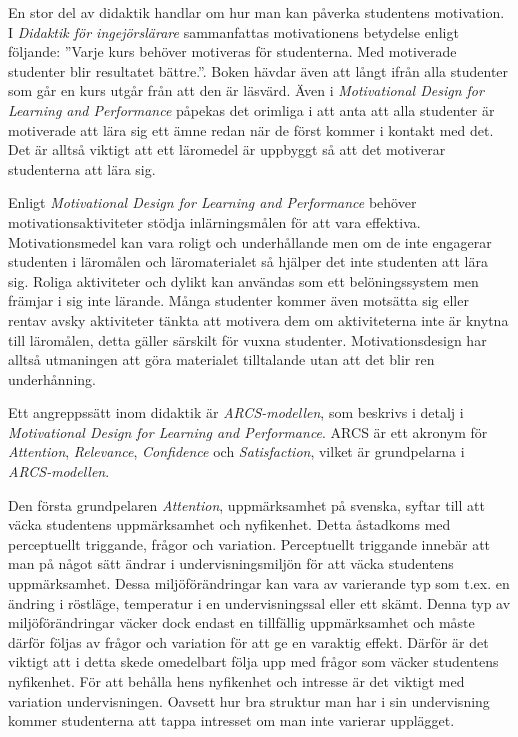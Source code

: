 \documentclass[]{article}
\begin{document}
En stor del av didaktik handlar om hur man kan påverka studentens motivation.
I \textit{Didaktik för ingejörslärare} sammanfattas motivationens betydelse
enligt följande: ”Varje kurs behöver motiveras för studenterna.
Med motiverade studenter blir resultatet bättre.”.
Boken hävdar även att långt ifrån alla studenter
som går en kurs utgår från att den är läsvärd.
Även i \textit{Motivational Design for Learning and Performance} påpekas det
orimliga i att anta att alla studenter är motiverade att lära sig ett ämne
redan när de först kommer i kontakt med det.
Det är alltså viktigt att ett läromedel är uppbyggt så att det motiverar
studenterna att lära sig.

Enligt \textit{Motivational Design for Learning and Performance} behöver
motivationsaktiviteter stödja inlärningsmålen för att vara effektiva.
Motivationsmedel kan vara roligt och underhållande men om de inte engagerar
studenten i läromålen och läromaterialet så hjälper det inte studenten att
lära sig. Roliga aktiviteter och dylikt kan användas som ett belöningssystem
men främjar i sig inte lärande. Många studenter kommer även motsätta sig
eller rentav avsky aktiviteter tänkta att motivera dem om aktiviteterna
inte är knytna till läromålen, detta gäller särskilt för vuxna studenter.
Motivationsdesign har alltså utmaningen att göra materialet tilltalande
utan att det blir ren underhånning.

Ett angreppssätt inom didaktik är \textit{ARCS-modellen},
som beskrivs i detalj i
\textit{Motivational Design for Learning and Performance}.
ARCS är ett akronym för \textit{Attention}, \textit{Relevance},
\textit{Confidence} och \textit{Satisfaction}, vilket är grundpelarna
i \textit{ARCS-modellen}.

Den första grundpelaren \textit{Attention}, uppmärksamhet på svenska,
syftar till att väcka studentens uppmärksamhet och nyfikenhet.
Detta åstadkoms med perceptuellt triggande, frågor och variation.
Perceptuellt triggande innebär att man på något sätt ändrar i
undervisningsmiljön för att väcka studentens uppmärksamhet.
Dessa miljöförändringar kan vara av varierande typ som t.ex. en ändring i
röstläge, temperatur i en undervisningssal eller ett skämt.
Denna typ av miljöförändringar väcker dock endast en tillfällig uppmärksamhet
och måste därför följas av frågor och variation för att ge en varaktig effekt.
Därför är det viktigt att i detta skede omedelbart följa upp med frågor som väcker
studentens nyfikenhet. För att behålla hens nyfikenhet och
intresse är det viktigt med variation undervisningen.
Oavsett hur bra struktur man har i sin undervisning kommer studenterna att tappa
intresset om man inte varierar upplägget.
\end{document}
